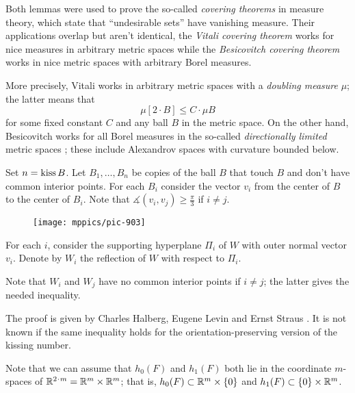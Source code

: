 Both lemmas were used to prove the so-called \emph{covering theorems} in measure theory,
which state that ``undesirable sets'' have vanishing measure.
Their applications overlap but aren't identical, the \emph{Vitali covering theorem} works for nice measures in arbitrary metric spaces while the \emph{Besicovitch covering theorem} works in nice metric spaces with arbitrary Borel measures.

More precisely, Vitali works in arbitrary metric spaces with a \emph{doubling measure} $\mu$;
the latter means that 
\[\mu [2\cdot B]\le C\cdot \mu B\] 
for some fixed constant $C$ and any ball $B$ in the metric space.
On the other hand, Besicovitch works for all Borel measures in the so-called \emph{directionally limited} metric spaces \cite[see 2.8.9 in][]{federer};
these include Alexandrov spaces with curvature bounded below.






Set $n=\mathop{\rm kiss} B$.
Let $B_1,\dots, B_n$ be copies of the ball $B$ that touch $B$ and don't have common interior points.
For each $B_i$ consider the vector $v_i$ from the center of $B$ to the center of $B_i$.
Note that $\measuredangle(v_i,v_j)\ge \tfrac\pi3$ if $i\ne j$.

\begin{wrapfigure}{r}{43 mm}
\vskip-0mm
\centering
\texttt{[image: mppics/pic-903]}
\end{wrapfigure}

For each $i$,
consider the supporting hyperplane $\Pi_i$
of $W$
with outer normal vector $v_i$.
Denote by $W_i$ the reflection of $W$ with respect to $\Pi_i$.

Note that $W_i$ and $W_j$ have no common interior points if $i\ne j$;
the latter gives the needed inequality.
\qeds



The proof is given by 
Charles Halberg, 
Eugene Levin 
and Ernst Straus 
\cite{halberg-levin-straus}.
It is not known if the same inequality holds for the orientation-preserving version of the kissing number.


Note that we can assume
that $h_0(F)$ and $h_1(F)$ both lie in the coordinate $m$-spaces of $\RR^{2\cdot m}=\RR^m\times \RR^m$;
that is,
$h_0(F)\z\subset\RR^m\times\{0\}$
and $h_1(F)\subset  \{0\}\times\mathbb{R}^m$.

